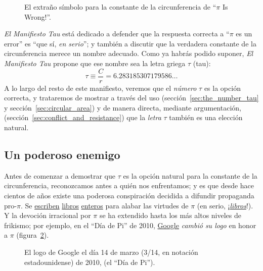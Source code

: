 \begin{figure}
\caption{El extraño símbolo para la constante de la circunferencia de ``$\pi$ Is Wrong!''.\label{fig:palais_tau}}
\end{figure}

\emph{El Manifiesto Tau} está dedicado a defender que la respuesta correcta a ``$\pi$ es un error'' es ``que sí, \emph{en serio}''; y también a discutir que la verdadera constante de la circunferencia merece un nombre adecuado. Como ya habrás podido suponer, \emph{El Manifiesto Tau} propone que ese nombre sea la letra griega $\tau$ (tau):
\begin{equation}
\label{eq:tau}
\tau \equiv \frac{C}{r} = 6.283185307179586\ldots
\end{equation}
A lo largo del resto de este manifiesto, veremos que el \emph{número} $\tau$ es la opción correcta, y trataremos de mostrar a través del uso (sección~\ref{sec:the_number_tau} y sección~\ref{sec:circular_area}) y de manera directa, mediante argumentación, (sección~\ref{sec:conflict_and_resistance}) que la  \emph{letra} $\tau$ también es una elección natural.

\subsection{Un poderoso enemigo} %
 \label{sec:a_powerful_enemy}

Antes de comenzar a demostrar que $\tau$ es la opción natural para la constante de la circunferencia, reconozcamos antes a quién nos enfrentamos; y es que desde hace cientos de años existe una poderosa conspiración decidida a difundir propaganda pro-$\pi$. Se  \href{http://www.amazon.com/exec/obidos/ISBN=0802713327/parallaxproductiA/}{escriben} \href{http://www.amazon.com/Pi-Sky-Counting-Thinking-Being/dp/0198539568}{libros} \href{http://www.amazon.com/exec/obidos/ISBN=0312381859/parallaxproductiA/}{enteros} para alabar las virtudes de $\pi$ (en serio, ¡\href{http://www.amazon.com/exec/obidos/ISBN=0387989463/parallaxproductiA/}{\emph{libros}}!). Y la devoción irracional por  $\pi$ se ha extendido hasta los más altos niveles de frikismo; por ejemplo, en el ``Día de Pi'' de 2010, \href{http://www.google.com/}{Google} \emph{cambió su logo} en honor a $\pi$ (figura~\ref{fig:google_pi_day.}).

\begin{figure}
\begin{center}
\end{center}
\caption{El logo de Google el día 14 de marzo (3/14, en notación estadounidense)
de 2010, (el ``Día de Pi'').\label{fig:google_pi_day.}}
\end{figure}

